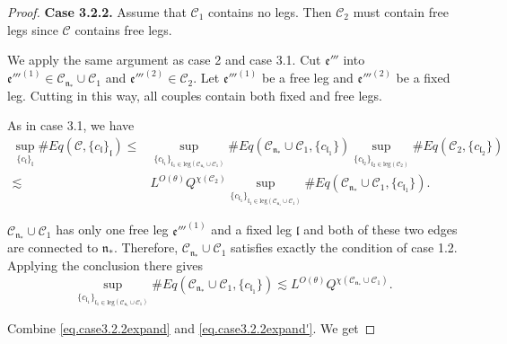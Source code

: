 \begin{proof}
    \textbf{Case 3.2.2.} Assume that $\mathcal{C}_1$ contains no legs. Then $\mathcal{C}_2$ must contain free legs since $\mathcal{C}$ contains free legs. 
    
    We apply the same argument as case 2 and case 3.1. Cut $\mathfrak{e}'''$ into $\mathfrak{e}'''^{(1)}\in \mathcal{C}_{\mathfrak{n}_*}\cup \mathcal{C}_1$ and $\mathfrak{e}'''^{(2)}\in \mathcal{C}_2$. Let $\mathfrak{e}'''^{(1)}$ be a free leg and $\mathfrak{e}'''^{(2)}$ be a fixed leg. Cutting in this way, all couples contain both fixed and free legs.
    
    As in case 3.1, we have
    \begin{equation}\label{eq.case3.2.2expand}
    \begin{split}
     \sup_{\{c_{\mathfrak{l}}\}_{\mathfrak{l}}}\#Eq(\mathcal{C},\{c_{\mathfrak{l}}\}_{\mathfrak{l}})
     \le&
     \sup_{\{c_{\mathfrak{l}_1}\}_{\mathfrak{l}_1\in \text{leg}(\mathcal{C}_{\mathfrak{n}_*}\cup \mathcal{C}_1)} } \# Eq(\mathcal{C}_{\mathfrak{n}_*}\cup \mathcal{C}_1,\{c_{\mathfrak{l}_1}\}) \sup_{\{c_{\mathfrak{l}_2}\}_{\mathfrak{l}_2\in \text{leg}(\mathcal{C}_2)} }\# Eq(\mathcal{C}_{2}, \{c_{\mathfrak{l}_2}\})
     \\
     \lesssim& L^{O(\theta)} Q^{\chi(\mathcal{C}_2)}\sup_{\{c_{\mathfrak{l}_1}\}_{\mathfrak{l}_1\in \text{leg}(\mathcal{C}_{\mathfrak{n}_*}\cup \mathcal{C}_1)} } \# Eq(\mathcal{C}_{\mathfrak{n}_*}\cup \mathcal{C}_1,\{c_{\mathfrak{l}_1}\}).
    \end{split}
    \end{equation}
    
    $\mathcal{C}_{\mathfrak{n}_*}\cup \mathcal{C}_1$ has only one free leg $\mathfrak{e}'''^{(1)}$ and a fixed leg $\mathfrak{l}$ and both of these two edges are connected to $\mathfrak{n}_*$. Therefore, $\mathcal{C}_{\mathfrak{n}_*}\cup \mathcal{C}_1$ satisfies exactly the condition of case 1.2. Applying the conclusion there gives
    \begin{equation}\label{eq.case3.2.2expand'}
     \sup_{\{c_{\mathfrak{l}_1}\}_{\mathfrak{l}_1\in \text{leg}(\mathcal{C}_{\mathfrak{n}_*}\cup \mathcal{C}_1)} } \# Eq(\mathcal{C}_{\mathfrak{n}_*}\cup \mathcal{C}_1,\{c_{\mathfrak{l}_1}\})\lesssim L^{O(\theta)} Q^{\chi(\mathcal{C}_{\mathfrak{n}_*}\cup \mathcal{C}_1)}.
    \end{equation}
    
    Combine \eqref{eq.case3.2.2expand} and \eqref{eq.case3.2.2expand'}. We get 
    

\end{proof}
